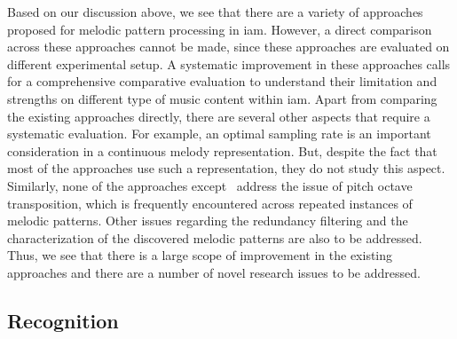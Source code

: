 Based on our discussion above, we see that there are a variety of approaches proposed for melodic pattern processing in \gls{iam}. However, a direct comparison across these approaches cannot be made, since these approaches are evaluated on different experimental setup. A systematic improvement in these approaches calls for a comprehensive comparative evaluation to understand their limitation and strengths on different type of music content within \gls{iam}. Apart from comparing the existing approaches directly, there are several other aspects that require a systematic evaluation. For example, an optimal sampling rate is an important consideration in a continuous melody representation. But, despite the fact that most of the approaches use such a representation, they do not study this aspect. Similarly, none of the approaches except~\cite{Rao2014} address the issue of pitch octave transposition, which is frequently encountered across repeated instances of melodic patterns. Other issues regarding the redundancy filtering and the characterization of the discovered melodic patterns are also to be addressed. Thus, we see that there is a large scope of improvement in the existing approaches and there are a number of novel research issues to be addressed. 


\subsection{ Recognition}
\label{sec:sota_raga_recognition}


